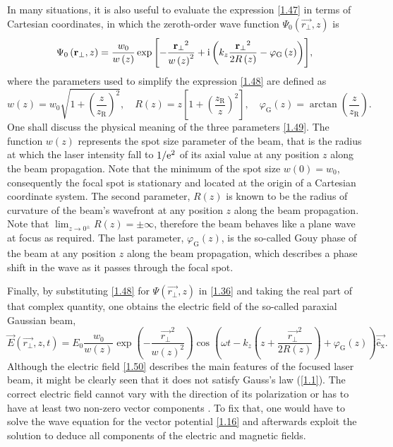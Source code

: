 In many situations, it is also useful to evaluate the expression \ref{1.47} in terms of Cartesian coordinates, in which the zeroth-order wave function $ \Psi_0 \left(\vec{r_\bot}, z \right) $ is
\begin{equation}
\label{1.48}
\Psi_0 \left(\mathbf{r_\bot}, z \right) = \frac{w_0}{w\left(z\right)} \exp{\left[- \frac{\mathbf{r_\bot}^2}{w\left(z \right)^2} + \mathrm{i}\left( k_z \frac{\mathbf{r_\bot}^2}{2 R\left(z \right)} - \varphi_\mathrm{G} \left( z\right) \right) \right]},
\end{equation}
where the parameters used to simplify the expression \ref{1.48} are defined as
\begin{equation}
\label{1.49}
w\left(z\right) = w_0 \sqrt{1 + \left(\frac{z}{z_\mathrm{R}}\right)^2}, \quad R\left(z \right) = z \left[1 + \left(\frac{z_\mathrm{R}}{z} \right)^2\right], \quad \varphi_\mathrm{G}\left(z\right) = \arctan{\left(\frac{z}{z_\mathrm{R}}\right)}.
\end{equation}
One shall discuss the physical meaning of the three parameters \ref{1.49}. The function $ w\left(z\right) $ represents the spot size parameter of the beam, that is the radius at which the laser intensity fall to $ 1/\mathrm{e}^2 $ of its axial value at any position $ z $ along the beam propagation. Note that the minimum of the spot size $ w(0) = w_0 $, consequently the focal spot is stationary and located at the origin of a Cartesian coordinate system. The second parameter, $ R\left(z \right) $ is known to be the radius of curvature of the beam's wavefront at any position $ z $ along the beam propagation. Note that $ \lim_{z \to 0^{\pm}} R(z) = \pm \infty $, therefore the beam behaves like a plane wave at focus as required. The last parameter, $ \varphi_\mathrm{G}\left(z\right) $, is the so-called Gouy phase \cite{Pang2012} of the beam at any position $ z $ along the beam propagation, which describes a phase shift in the wave as it passes through the focal spot.

Finally, by substituting \ref{1.48} for $ \Psi \left(\vec{r_\bot}, z \right) $ in \ref{1.36} and taking the real part of that complex quantity, one obtains the electric field of the so-called paraxial Gaussian beam,
\begin{equation}
\label{1.50}
\vec{E}\left(\vec{r_\bot}, z, t \right) = E_0 \frac{w_0}{w(z)} \exp\left(-\frac{\vec{r_\bot}^2}{w(z)^2}\right) \cos\left(\omega t - k_z \left(z + \frac{\vec{r_\bot}^2}{2 R(z)} \right) + \varphi_\mathrm{G}\left(z\right) \right) \mathrm{\vec{\hat{e}_x}}.
\end{equation}
Although the electric field \ref{1.50} describes the main features of the focused laser beam, it might be clearly seen that it does not satisfy Gauss's law (\ref{1.1}). The correct electric field cannot vary with the direction of its polarization or has to have at least two non-zero vector components \cite{Davis1979}. To fix that, one would have to solve the wave equation for the vector potential \ref{1.16} and afterwards exploit the solution to deduce all components of the electric and magnetic fields.   

